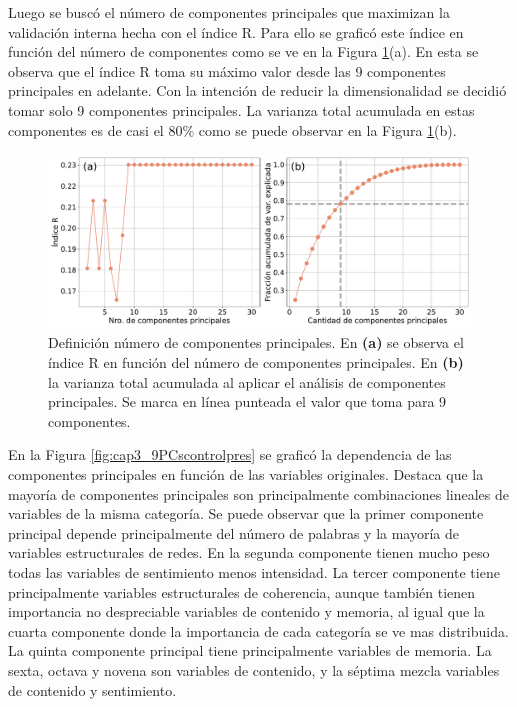 Luego se buscó el número de componentes principales que maximizan la validación interna hecha con el índice R. Para ello se graficó este índice en función del número de componentes como se ve en la Figura \ref{fig:cap3_defpcscontrolpres}(a). En esta se observa que el índice R toma su máximo valor desde las 9 componentes principales en adelante. Con la intención de reducir la dimensionalidad se decidió tomar solo 9 componentes principales. La varianza total acumulada en estas componentes es de casi el 80$\%$ como se puede observar en la Figura \ref{fig:cap3_defpcscontrolpres}(b).

\begin{figure}[H]
    \centering
    \includegraphics[width = 15cm]{figures/ch03/PCA_clustering/Primer tiempo/RindexyPCs_pres_control.pdf} 
    \caption{Definición número de componentes principales. En \textbf{(a)} se observa el índice R en función del número de componentes principales. En \textbf{(b)} la varianza total acumulada al aplicar el análisis de componentes principales. Se marca en línea punteada el valor que toma para 9 componentes.}
\label{fig:cap3_defpcscontrolpres}
\end{figure}

En la Figura \ref{fig:cap3_9PCscontrolpres} se graficó la dependencia de las componentes principales en función de las variables originales. Destaca que la mayoría de componentes principales son principalmente combinaciones lineales de variables de la misma categoría. Se puede observar que la primer componente principal depende principalmente del número de palabras y la mayoría de variables estructurales de redes. En la segunda componente tienen mucho peso todas las variables de sentimiento menos intensidad. La tercer componente tiene principalmente variables estructurales de coherencia, aunque también tienen importancia no despreciable variables de contenido y memoria, al igual que la cuarta componente donde la importancia de cada categoría se ve mas distribuida. La quinta componente principal tiene principalmente variables de memoria. La sexta, octava y novena son variables de contenido, y la séptima mezcla variables de contenido y sentimiento.

